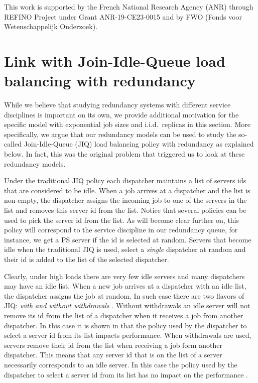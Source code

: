 \documentclass[acmsmall,nonacm]{acmart}
\begin{document}
\begin{acks}
    This work is supported by the French National Research Agency (ANR) through REFINO Project under Grant ANR-19-CE23-0015 and by FWO (Fonds voor Wetenschappelijk Onderzoek).
\end{acks}






\appendix 

\section{Link with Join-Idle-Queue load balancing with redundancy}
\label{apx:JIQ-d}


While we believe that studying redundancy systems with different service disciplines is important on its own, we provide additional
motivation for the specific model with exponential job sizes and i.i.d.~replicas in this section. More specifically,
we argue that our redundancy models can be used to study the so-called Join-Idle-Queue (JIQ) load balancing policy with redundancy
as explained below.  In fact, this was the original problem that triggered us to look at these redundancy models.

Under the traditional JIQ policy \cite{lu1,stolyar1} each dispatcher maintains a list of servers ids that are considered to
be idle. When a job arrives at a dispatcher and the list is non-empty, the dispatcher assigns the incoming job to one
of the servers in the list and removes this server id from the list. Notice that several policies can be used to pick the server
id from the list. As will become clear further on, this policy will correspond to the service discipline in our redundancy queue,
for instance, we get a PS server if the id is selected at random.
Servers that become idle when the traditional JIQ is used, select a {\it single} dispatcher at random and their id is added to the list of the selected dispatcher. 

Clearly, under high loads there are very few idle servers and many dispatchers may have an idle
list. When a new job arrives at a dispatcher with an idle list, the dispatcher assigns the job at random. In  such case there
are two flavors of JIQ: {\it with and without withdrawals} \cite{wangJIQ, myMASCOTSpaper}. Without withdrawals an idle server will not remove its id from the
list of a dispatcher when it receives a job from another dispatcher. In this case it is shown in \cite{mitzenmacherJIQ}
that the policy used by the dispatcher to select a server id from its list impacts performance. When withdrawals are used,
servers remove their id from the list when receiving a job form another dispatcher. This means that any server id that
is on the list of a server necessarily corresponds to an idle server. In this case the policy used by the
dispatcher to select a server id from its list has no impact on the performance \cite{myMASCOTSpaper}.
\end{document}
